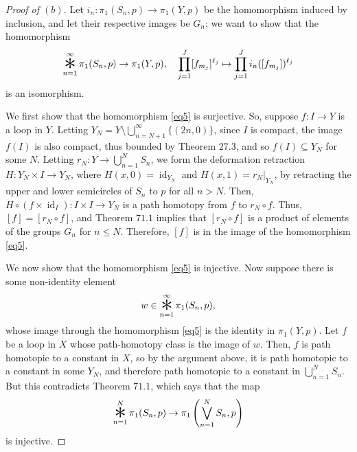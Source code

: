 \documentclass[12pt]{article}
\theoremstyle{remark}
\DeclareMathOperator{\id}{id}
\DeclareMathOperator*{\bigast}{\raisebox{-0.6ex}{\scalebox{2.5}{$\ast$}}}
\begin{document}
\begin{proof}[Proof of $(b)$]
  Let $i_n\colon \pi_1(S_n,p) \to \pi_1(Y,p)$ be the homomorphism induced by inclusion, and let their respective images be $G_n$; we want to show that the homomorphism
  \begin{equation}\label{eq5}
    \bigast_{n=1}^\infty \pi_1(S_n,p) \to \pi_1(Y,p), \quad \prod_{j=1}^J [f_{m_j}]^{\ell_j} \mapsto \prod_{j=1}^J i_n([f_{m_j}])^{\ell_j}
  \end{equation}
  is an isomorphism.
  \par We first show that the homomorphism \eqref{eq5} is surjective. So,
  suppose $f\colon I \to Y$ is a loop in $Y$. Letting $Y_N = Y \setminus
  \bigcup_{n=N+1}^\infty \{(2n,0)\}$, since $I$ is compact, the image $f(I)$ is
  also compact, thus bounded by Theorem $27.3$, and so $f(I) \subseteq Y_N$ for
  some $N$. Letting $r_N\colon Y \to \bigcup_{n=1}^N S_n$, we form the
  deformation retraction $H\colon Y_N \times I \to Y_N$, where $H(x,0) =
  \id_{Y_N}$ and $H(x,1) = r_N|_{Y_N}$, by retracting the upper and lower
  semicircles of $S_n$ to $p$ for all $n > N$. Then, $H \circ (f \times
  \id_I)\colon I \times I \to Y_N$ is a path homotopy from $f$ to $r_N \circ f$. Thus, $[f] = [r_N \circ f]$, and Theorem $71.1$ implies that $[r_N \circ f]$ is a product of elements of the groups $G_n$ for $n \le N$. Therefore, $[f]$ is in the image of the homomorphism \eqref{eq5}.
  \par We now show that the homomorphism \eqref{eq5} is injective. Now suppose there is some non-identity element
  \begin{equation*}
    w \in \bigast_{n=1}^\infty \pi_1(S_n,p),
  \end{equation*}
  whose image through the homomorphism \eqref{eq5} is the identity in $\pi_1(Y,p)$. Let $f$ be a loop in $X$ whose path-homotopy class is the image of $w$. Then, $f$ is path homotopic to a constant in $X$, so by the argument above, it is path homotopic to a constant in some $Y_N$, and therefore path homotopic to a constant in $\bigcup_{n=1}^N S_n$. But this contradicts Theorem $71.1$, which says that the map
  \begin{equation*}
    \bigast_{n=1}^N \pi_1(S_n,p) \to \pi_1\left( \bigvee_{n=1}^N S_n,p \right)
  \end{equation*}
  is injective.
\end{proof}

\setcounter{subsection}{72}
\end{document}
